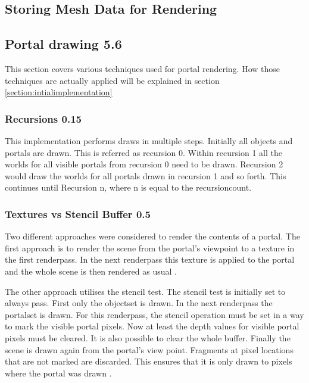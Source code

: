 \subsection{Storing Mesh Data for Rendering}


\subsection{Portal drawing 5.6}
\label{section:portaldrawing}

This section covers various techniques used for portal rendering. How those techniques are actually applied will be explained in section \ref{section:intialimplementation}

\subsubsection{Recursions 0.15}


This implementation performs draws in multiple steps. Initially all objects and portals are drawn. This is referred as recursion 0. Within recursion 1 all the worlds for all visible portals from recursion 0 need to be drawn. Recursion 2 would draw the worlds for all portals drawn in recursion 1 and so forth. This continues until Recursion n, where n is equal to the \gls{recursioncount}.


\subsubsection{Textures vs Stencil Buffer 0.5}
\label{section:textursVsStencil}
Two different approaches were considered to render the contents of a portal. The first approach is to render the scene from the portal's viewpoint to a texture in the first renderpass. In the next renderpass this texture is applied to the portal and the whole scene is then rendered as usual \cite{schmalstieg:1999:sewing, lecture:portalProblems}.

The other approach utilises the stencil test. The stencil test is initially set to always pass. First only the \gls{objectset} is drawn. In the next renderpass the \gls{portalset} is drawn. For this renderpass, the stencil operation must be set in a way to mark the visible portal pixels. Now at least the depth values for visible portal pixels must be cleared. It is also possible to clear the whole buffer. Finally the scene is drawn again from the portal's view point. Fragments at pixel locations that are not marked are discarded. This ensures that it is only drawn to pixels where the portal was drawn \cites{schmalstieg:1999:sewing, lowe:2005:technique, lecture:portalProblems}.

